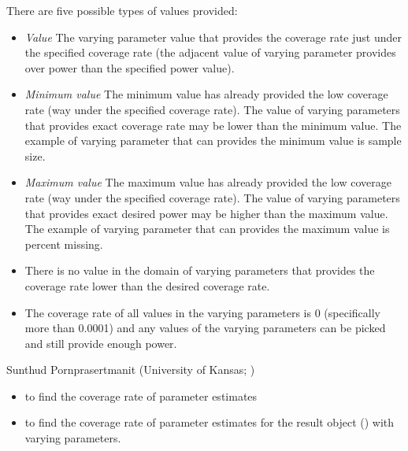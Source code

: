 \documentclass[a4paper]{book}
\begin{document}
%
\begin{Value}
There are five possible types of values provided:
\begin{itemize}

\item \emph{Value} The varying parameter value that provides the coverage rate just under the specified coverage rate (the adjacent value of varying parameter provides over power than the specified power value).
\item \emph{Minimum value} The minimum value has already provided the low coverage rate (way under the specified coverage rate). The value of varying parameters that provides exact coverage rate may be lower than the minimum value. The example of varying parameter that can provides the minimum value is sample size.
\item \emph{Maximum value} The maximum value has already provided the low coverage rate (way under the specified coverage rate). The value of varying parameters that provides exact desired power may be higher than the maximum value. The example of varying parameter that can provides the maximum value is percent missing.
\item {} There is no value in the domain of varying parameters that provides the coverage rate lower than the desired coverage rate.
\item {} The coverage rate of all values in the varying parameters is 0 (specifically more than 0.0001) and any values of the varying parameters can be picked and still provide enough power.

\end{itemize}

\end{Value}
%
\begin{Author}\relax
Sunthud Pornprasertmanit (University of Kansas; )
\end{Author}
%
\begin{SeeAlso}\relax
\begin{itemize}

\item {} to find the coverage rate of parameter estimates		
\item {} to find the coverage rate of parameter estimates for the result object () with varying parameters.

\end{itemize}

\end{SeeAlso}
\end{document}
